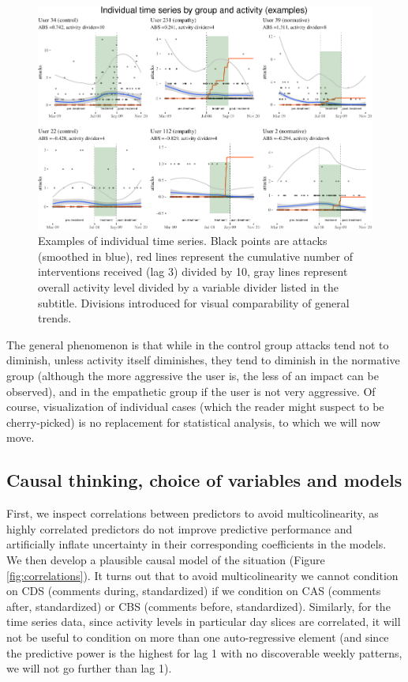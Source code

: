 \documentclass[preprint,12pt]{elsarticle}
\begin{document}
\begin{figure}

\begin{center}\includegraphics[width=1\linewidth]{figures/fig:tsVisPlot6-1} \end{center}
\caption{Examples of individual time series. Black points are attacks (smoothed in blue), red lines represent the cumulative number of interventions received (lag 3) divided by 10, gray lines represent overall activity level divided by a variable divider listed in the subtitle. Divisions introduced for visual comparability of general trends.}
\label{fig:tsVis}
\end{figure}

\normalsize

The general phenomenon is that while in the control group attacks tend
not to diminish, unless activity itself diminishes, they tend to
diminish in the normative group (although the more aggressive the user
is, the less of an impact can be observed), and in the empathetic group
if the user is not very aggressive. Of course, visualization of
individual cases (which the reader might suspect to be cherry-picked) is
no replacement for statistical analysis, to which we will now move.



\subsection{Causal thinking, choice of variables and
models}\label{subsec:causal-thinking-choice-of-variables-and-models}

First, we inspect correlations between predictors to avoid multicolinearity, as highly correlated predictors do not improve predictive performance and artificially inflate uncertainty in their corresponding coefficients in the models. We then develop
a plausible causal model of the situation (Figure
\ref{fig:correlations}). It turns out that to avoid multicolinearity we
cannot condition on CDS (comments during, standardized) if we condition on CAS (comments after, standardized) or CBS (comments before, standardized). Similarly, for
the time series data, since activity levels in particular day slices are
correlated, it will not be useful to condition on more than one
auto-regressive element (and since the predictive power is the highest
for lag 1 with no discoverable weekly patterns, we will not go further
than lag 1).
\end{document}
